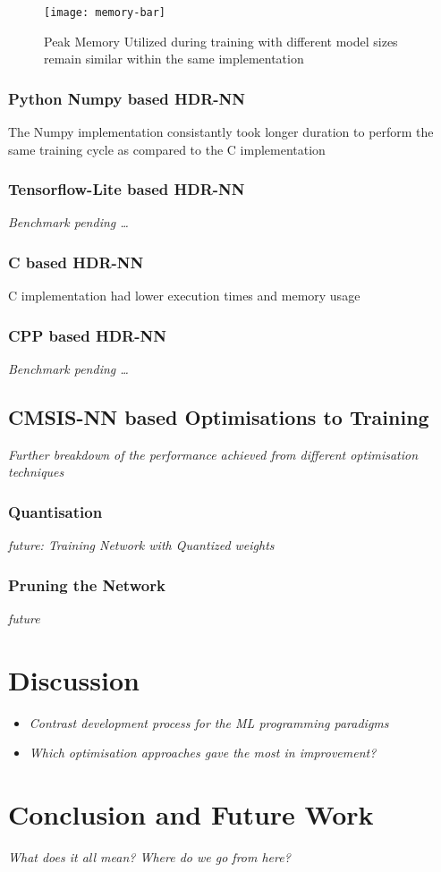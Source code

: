 \begin{figure}[ht]
	\centering
	\texttt{[image: memory-bar]}
	\caption[Peak Memory Utilisation]{Peak Memory Utilized during training with different model sizes remain similar within the same implementation}
\end{figure}

\subsection[Python - Numpy]{Python Numpy based HDR-NN}

The Numpy implementation consistantly took longer duration to perform the same training cycle as compared to the C implementation

\subsection[Tensorflow Lite]{Tensorflow-Lite based HDR-NN}
\textit{Benchmark pending \dots}

\subsection[C]{C based HDR-NN}

C implementation had lower execution times and memory usage

\subsection[CPP - Eigen]{CPP based HDR-NN}
\textit{Benchmark pending \dots}

\section{CMSIS-NN based Optimisations to Training}
\textit{Further breakdown of the performance achieved from different optimisation techniques}

\subsection{Quantisation}
\textit{future: Training Network with Quantized weights}

\subsection{Pruning the Network}
\textit{future}

\chapter{Discussion}
\begin{itemize}
	\item \textit{Contrast development process for the ML programming paradigms}
	\item \textit{Which optimisation approaches gave the most in improvement?}
\end{itemize}

\chapter{Conclusion and Future Work}
\textit{What does it all mean? Where do we go from here?}
